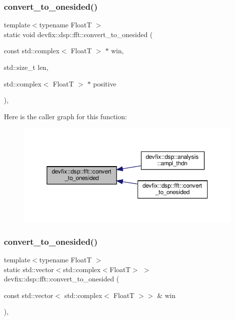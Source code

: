 \subsubsection{\texorpdfstring{convert\+\_\+to\+\_\+onesided()}{convert\_to\_onesided()}\hspace{0.1cm}{\footnotesize\ttfamily [1/3]}}
{\footnotesize\ttfamily template$<$typename FloatT $>$ \\
static void devfix\+::dsp\+::fft\+::convert\+\_\+to\+\_\+onesided (\begin{DoxyParamCaption}\item[{const std\+::complex$<$ FloatT $>$ $\ast$}]{win,  }\item[{std\+::size\+\_\+t}]{len,  }\item[{std\+::complex$<$ FloatT $>$ $\ast$}]{positive }\end{DoxyParamCaption})\hspace{0.3cm}{\ttfamily [inline]}, {\ttfamily [static]}}

Here is the caller graph for this function\+:\nopagebreak
\begin{figure}[H]
\begin{center}
\leavevmode
\includegraphics[width=350pt]{structdevfix_1_1dsp_1_1fft_a6ed95d078d9828e160e6d9911c253b5f_icgraph}
\end{center}
\end{figure}
\mbox{\label{structdevfix_1_1dsp_1_1fft_a595260b93cce8bcec41570a93521b263}} 
\subsubsection{\texorpdfstring{convert\+\_\+to\+\_\+onesided()}{convert\_to\_onesided()}\hspace{0.1cm}{\footnotesize\ttfamily [2/3]}}
{\footnotesize\ttfamily template$<$typename FloatT $>$ \\
static std\+::vector$<$std\+::complex$<$FloatT$>$ $>$ devfix\+::dsp\+::fft\+::convert\+\_\+to\+\_\+onesided (\begin{DoxyParamCaption}\item[{const std\+::vector$<$ std\+::complex$<$ FloatT $>$$>$ \&}]{win }\end{DoxyParamCaption})\hspace{0.3cm}{\ttfamily [inline]}, {\ttfamily [static]}}

